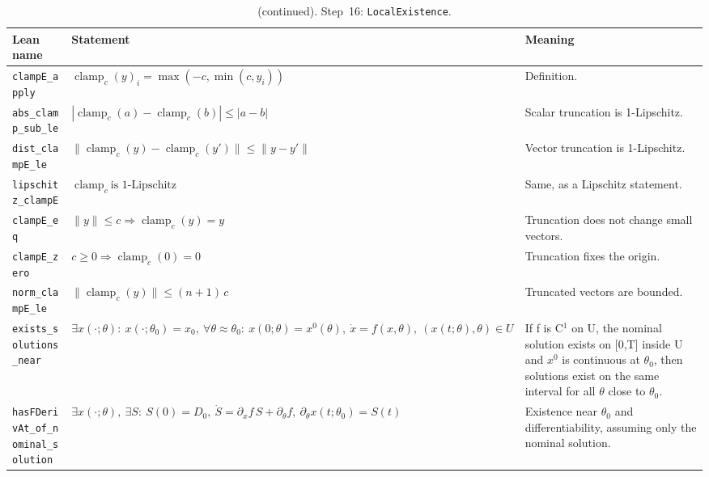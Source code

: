 \addtocounter{table}{-1}
{\small
\begin{longtable}{@{}>{\raggedright\arraybackslash}p{3.6cm}>{\raggedright\arraybackslash}p{6.6cm}>{\raggedright\arraybackslash}p{5.6cm}@{}}
\caption[]{(continued). Step~16: \texttt{LocalExistence}.}\\
\toprule
Lean name & Statement & Meaning \\
\midrule
\endhead
\texttt{clampE\_\allowbreak{}apply} & $\displaystyle \operatorname{clamp}_c(y)_i=\max(-c,\min(c,y_i))$ & Definition. \\[3pt]
\texttt{abs\_\allowbreak{}clamp\_\allowbreak{}sub\_\allowbreak{}le} & $\displaystyle |\operatorname{clamp}_c(a)-\operatorname{clamp}_c(b)|\le|a-b|$ & Scalar truncation is 1-Lipschitz. \\[3pt]
\texttt{dist\_\allowbreak{}clampE\_\allowbreak{}le} & $\displaystyle \|\operatorname{clamp}_c(y)-\operatorname{clamp}_c(y')\|\le\|y-y'\|$ & Vector truncation is 1-Lipschitz. \\[3pt]
\texttt{lipschitz\_\allowbreak{}clampE} & $\displaystyle \operatorname{clamp}_c\ \text{is 1-Lipschitz}$ & Same, as a Lipschitz statement. \\[3pt]
\texttt{clampE\_\allowbreak{}eq} & $\displaystyle \|y\|\le c\Rightarrow\operatorname{clamp}_c(y)=y$ & Truncation does not change small vectors. \\[3pt]
\texttt{clampE\_\allowbreak{}zero} & $\displaystyle c\ge0\Rightarrow\operatorname{clamp}_c(0)=0$ & Truncation fixes the origin. \\[3pt]
\texttt{norm\_\allowbreak{}clampE\_\allowbreak{}le} & $\displaystyle \|\operatorname{clamp}_c(y)\|\le(n+1)\,c$ & Truncated vectors are bounded. \\[3pt]
\texttt{exists\_\allowbreak{}solutions\_\allowbreak{}near} & $\displaystyle \exists x(\cdot;\theta):\ x(\cdot;\theta_0)=x_0,\ \forall\theta\approx\theta_0:\ x(0;\theta)=x^0(\theta),\ \dot x=f(x,\theta),\ (x(t;\theta),\theta)\in U$ & If f is C$^1$ on U, the nominal solution exists on [0,T] inside U and $x^0$ is continuous at $\theta_0$, then solutions exist on the same interval for all $\theta$ close to $\theta_0$. \\[3pt]
\texttt{hasFDerivAt\_\allowbreak{}of\_\allowbreak{}nominal\_\allowbreak{}solution} & $\displaystyle \exists x(\cdot;\theta),\ \exists S:\ S(0)=D_0,\ \dot S=\partial_xf\,S+\partial_\theta f,\ \partial_\theta x(t;\theta_0)=S(t)$ & Existence near $\theta_0$ and differentiability, assuming only the nominal solution. \\[3pt]
\bottomrule
\end{longtable}
}

